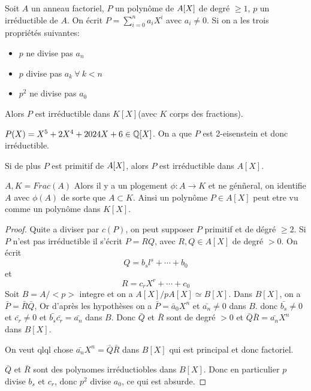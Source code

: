 \begin{theorem}
	Soit $A$ un anneau factoriel, $P$ un polynôme  de $A[X]$ de degré $\geq 1$, $p$ un irréductible de $A$.
	On écrit $P = \sum\limits_{i=0}^n a_iX^i$ avec $a_i \neq 0$. Si on a les trois propriétés suivantes:
	\begin{itemize}
		\item $p$ ne divise pas $a_n$
		\item $p$ divise pas $a_k \ \forall \ k < n$
		\item $p^2$ ne divise pas $a_0$
	\end{itemize}
	Alors $P$ est irréductible dans $K[X]$(avec $K$ corps des fractions).
\end{theorem}

\begin{example}
	$P(X) = X^5 + 2X^4 + 2024X + 6\in \mathbb{Q}[X]$. On a que $P$ est 2-eisenstein et donc irréductible.
\end{example}

\begin{coro}
	Si de plus $P$ est primitif de $A[X]$, alors $P$ est irréductible dans $A[X]$.
\end{coro}

\begin{remarque} %
	$A, K  = Frac(A)$ Alors il y a un plogement $\phi: A \to K$ et ne génñeral, on identifie $A$ avec $\phi(A)$ de sorte que $A \subset K$.
	Ainsi un polynôme $P \in A[X]$  peut etre vu comme un polynôme dans $K[X]$.
\end{remarque}

\begin{proof}
	Quite a diviser par $c(P)$, on peut supposer $P$ primitif et de dégré $\geq 2$.
	Si $P$ n'est pas irréductible il s'écrit $P=RQ$, avec $R, Q \in A[X]$ de degré $>0$.
	On écrit $$Q = b_sl^s + \cdots + b_0$$ et $$R = c_rX^r + \cdots + c_0$$
	Soit $B = A/<p>$ integre et on a $A[X]/pA[X] \simeq B[X]$.
	Dans $B[X]$, on a $\bar{P} = \bar{R}\bar{Q}$,
	Or d'après les hypothèses on a $\bar{P} = \bar{a}_0X^n$ et $\bar{a_n} \neq 0 $ dans $B$.
	donc $\bar{b_s} \neq 0$ et $\bar{c_r} \neq 0$ et $\bar{b_s}\bar{c_r} = \bar{a_n}$ dans $B$.
	Donc $\bar{Q}$ et $\bar{R}$ sont de degré $>0$ et $\bar{Q}\bar{R} = \bar{a_n}X^n$ dans $B[X]$.

	On veut qlql chose $\bar{a_n}X^n= \bar{Q}\bar{R}$ dans $B[X]$ qui est principal et donc factoriel.


	$\bar{Q}$ et $\bar{R}$ sont des polynomes irréductiobles dans $B[X]$. Donc en particulier
	$p$ divise $b_s$ et $c_r$, donc $p^2$ divise $a_0$, ce qui est absurde.
\end{proof}


